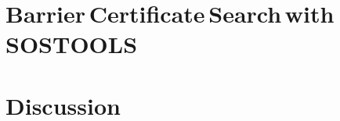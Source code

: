 \chapter[Barrier Certificate Search with SOSTOOLS]{Barrier\,Certificate\,Search\,with\,SOSTOOLS}\label{chap:sostools}
	
	
	
%	
%
%
%


\chapter{Discussion}\label{chap:conclusion}


\label{totalpage}

\begingroup
\raggedright
\clearpage
{}

\endgroup
\label{sourceliste}

\newpage


